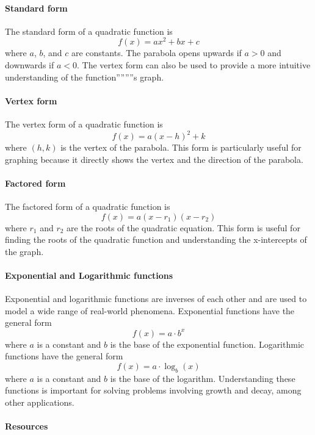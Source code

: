 \paragraph{Standard form}

The standard form of a quadratic function is
$$
f(x) = ax^2 + bx + c
$$
where $a$, $b$, and $c$ are constants. The parabola opens upwards if $a > 0$ and downwards if $a < 0$. The vertex form can also be used to provide a more intuitive understanding of the function''''''''s graph.

\paragraph{Vertex form}

The vertex form of a quadratic function is
$$
f(x) = a(x - h)^2 + k
$$
where $(h, k)$ is the vertex of the parabola. This form is particularly useful for graphing because it directly shows the vertex and the direction of the parabola.

\paragraph{Factored form}

The factored form of a quadratic function is
$$
f(x) = a(x - r_1)(x - r_2)
$$
where $r_1$ and $r_2$ are the roots of the quadratic equation. This form is useful for finding the roots of the quadratic function and understanding the x-intercepts of the graph.

\paragraph{Exponential and Logarithmic functions}

Exponential and logarithmic functions are inverses of each other and are used to model a wide range of real-world phenomena. Exponential functions have the general form
$$
f(x) = a \cdot b^x
$$
where $a$ is a constant and $b$ is the base of the exponential function. Logarithmic functions have the general form
$$
f(x) = a \cdot \log_b(x)
$$
where $a$ is a constant and $b$ is the base of the logarithm. Understanding these functions is important for solving problems involving growth and decay, among other applications.

\paragraph{Resources}


